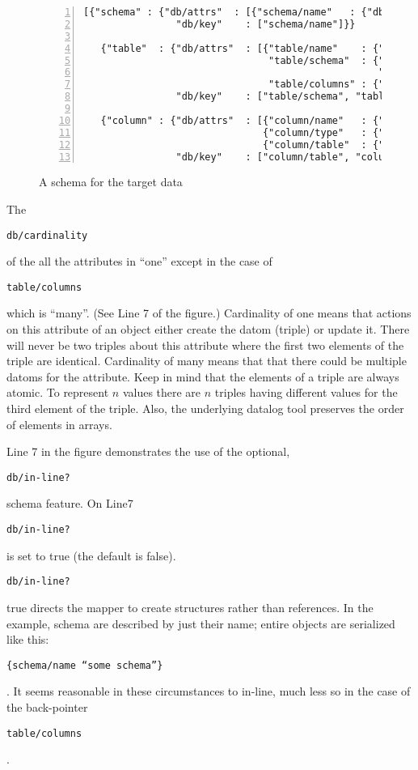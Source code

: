 \documentclass[9pt,letterpaper]{article}
\newcommand{\stt}[1]{\begin{footnotesize}\texttt{#1}\end{footnotesize}}
\begin{document}
\begin{figure}[H]
  \caption{A schema for the target data}
  \label{code:example-schema-1}
\begin{lstlisting}[numberstyle=\scriptsize,basicstyle=\ttfamily\scriptsize,numbers=left,stepnumber=1,breaklines=true]
  [{"schema" : {"db/attrs"  : [{"schema/name"   : {"db/type" : "string", "db/cardinality" : "one"}}],
                "db/key"    : ["schema/name"]}}

   {"table"  : {"db/attrs"  : [{"table/name"    : {"db/type" : "string", "db/cardinality" : "one" },
                                "table/schema"  : {"db/type" : "object", "db/cardinality" : "one",
                                                   "db/in-line?" : true},
                                "table/columns" : {"db/type" : "object", "db/cardinality" : "many"}}],
                "db/key"    : ["table/schema", "table/name"]}}

   {"column" : {"db/attrs"  : [{"column/name"   : {"db/type" : "string", "db/cardinality" : "one"}},
                               {"column/type"   : {"db/type" : "string", "db/cardinality" : "one"}},
                               {"column/table"  : {"db/type" : "object", "db/cardinality" : "one"}}],
                "db/key"    : ["column/table", "column/name"]}}]
\end{lstlisting}
\end{figure}

The \stt{db/cardinality} of the all the attributes in ``one'' except in the case of \stt{table/columns} which is ``many''.
(See Line 7 of the figure.)
Cardinality of one means that actions on this attribute of an object either create the datom (triple) or update it.
There will never be two triples about this attribute where the first two elements of the triple are identical.
Cardinality of many means that that there could be multiple datoms for the attribute.
Keep in mind that the elements of a triple are always atomic.
To represent $n$ values there are $n$ triples having different values for the third element of the triple.
Also, the underlying datalog tool preserves the order of elements in arrays.

Line 7 in the figure demonstrates the use of the optional, \stt{db/in-line?} schema feature.
On Line7 \stt{db/in-line?} is set to true (the default is false).
\stt{db/in-line?} true directs the mapper to create structures rather than references.
In the example, schema are described by just their name; entire objects are serialized like this: \stt{\{schema/name ``some schema''\}}.
It seems reasonable in these circumstances to in-line, much less so in the case of the back-pointer \stt{table/columns}.
\end{document}
